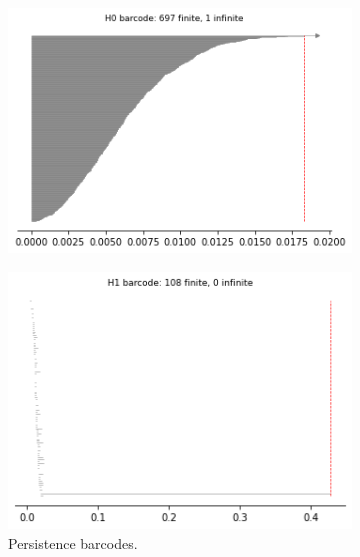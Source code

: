 \begin{figure}[H]
\begin{subfigure}[b]{0.25\textwidth}
\end{subfigure}
\begin{subfigure}[b]{0.24\textwidth}
    \includegraphics[width=\textwidth]{figures/torus_H0_barcode.png}
    \caption{}
\end{subfigure}
\begin{subfigure}[b]{0.24\textwidth}
    \includegraphics[width=\textwidth]{figures/torus_H1_barcode.png}
        \caption{Persistence barcodes.}
\end{subfigure}
\begin{subfigure}[b]{0.24\textwidth}

\end{subfigure}
\end{figure}
